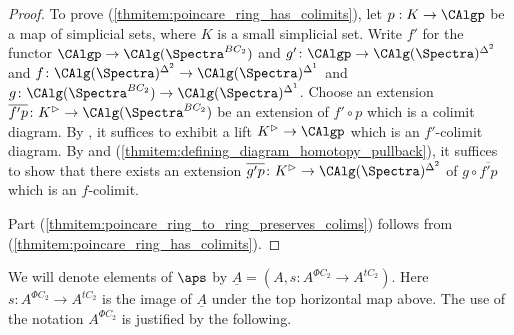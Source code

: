\begin{proof}
    To prove (\ref{thmitem:poincare_ring_has_colimits}), let $p:K\to \CAlgp$ be a map of simplicial sets, where $K$ is a small simplicial set. 
    Write $ f' $ for the functor $\CAlgp \to \CAlg(\Spectra^{BC_2})$ and $ g'\colon \CAlgp \to  \CAlg(\Spectra)^{\Delta^2} $ and $ f \colon \CAlg(\Spectra)^{\Delta^2} \to  \CAlg(\Spectra)^{\Delta^1} $ and $ g \colon \CAlg(\Spectra^{BC_2}) \to  \CAlg(\Spectra)^{\Delta^1} $. 
    Choose an extension $ \overline{f'p} \colon K^\vartriangleright\to \CAlg(\Spectra^{BC_2}) $ be an extension of $ f'\circ p $ which is a colimit diagram. 
    By \cite[Proposition 4.3.1.5(2)]{HTT}, it suffices to exhibit a lift $ K^\vartriangleright \to \CAlgp $ which is an $ f' $-colimit diagram. 
    By \cite[Prposition 4.3.1.5(4)]{HTT} and (\ref{thmitem:defining_diagram_homotopy_pullback}), it suffices to show that there exists an extension $ \overline{g'p} \colon K^\vartriangleright \to \CAlg(\Spectra)^{\Delta^2} $ of $ g \circ \overline{f'p} $ which is an $ f $-colimit. 

    Part (\ref{thmitem:poincare_ring_to_ring_preserves_colims}) follows from (\ref{thmitem:poincare_ring_has_colimits}). 
\end{proof}

We will denote elements of $\aps$ by $\underline{A}=(A,s:A^{\Phi C_2}\to A^{tC_2})$. Here $s:A^{\Phi C_2}\to A^{tC_2}$ is the image of $\underline{A}$ under the top horizontal map above. The use of the notation $A^{\Phi C_2}$ is justified by the following.

